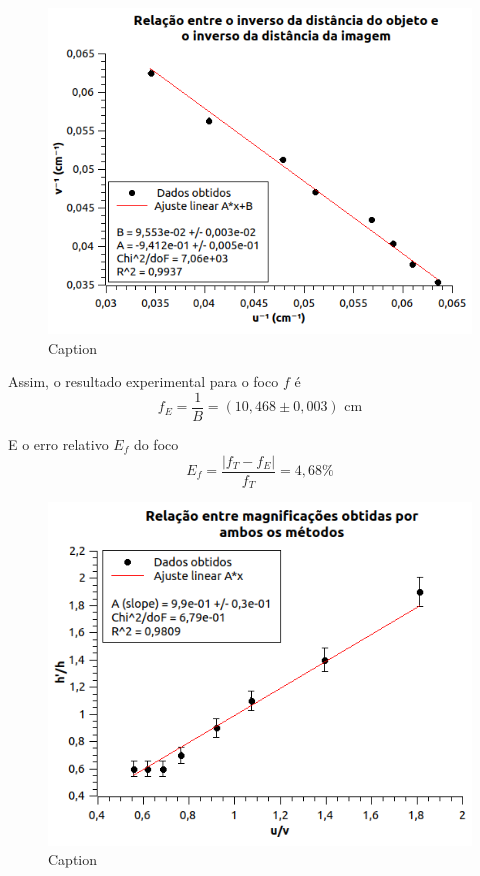 \documentclass[report,12pt,openright,oneside,a4paper,brazil]{abntex2}
\begin{document}
\begin{figure}[H]
    \centering
    \includegraphics[scale=0.7]{Figuras/distObjIm.png}
    \caption{Caption}
    \label{fig:my_label}
\end{figure}

Assim, o resultado experimental para o foco $f$ é
\begin{equation*}
	f_E=\frac{1}{B}=(10,468 \pm 0,003)\text{ cm}
\end{equation*}

E o erro relativo $E_f$ do foco
$$E_f=\frac{|f_T-f_E|}{f_T}=4,68\%$$


\begin{figure}[H]
    \centering
    \includegraphics[scale=0.7]{Figuras/magni.png}
    \caption{Caption}
    \label{fig:my_label2}
\end{figure}
\end{document}
